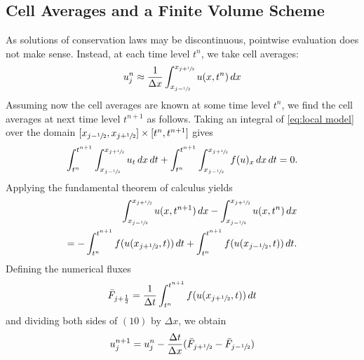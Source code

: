 \subsection{Cell Averages and a Finite Volume Scheme}
As solutions of conservation laws may be discontinuous, pointwise evaluation does not make sense. Instead, at each time level $t^n$, we take cell averages:
\begin{equation}
    \begin{split}
        u_{j}^{n} \approx \frac{1}{\Delta x}\int_{x_{j-\sfrac{1}{2}}}^{x_{j+\sfrac{1}{2}}} u(x,t^n) \,dx
    \end{split}
\end{equation}
Assuming now the cell averages are known at some time level $t^n$, we find the cell averages at next time level $t^{n+1}$ as follows. Taking an integral of \eqref{eq:local model} over the domain $[x_{j- \sfrac{1}{2}}, x_{j+\sfrac{1}{2}}] \times [t^n, t^{n+1}] $ gives
\begin{align*}
    \int_{t^n}^{t^{n+1}} \int_{x_{j-\sfrac{1}{2}}}^{x_{j+\sfrac{1}{2}}} {u_{t} \,dx \, dt}
    +\int_{t^n}^{t^{n+1}} \int_{x_{j-\sfrac{1}{2}}}^{x_{j+\sfrac{1}{2}}} f(u)_{x} \,dx \, dt = 0.
\end{align*}
Applying the fundamental theorem of calculus yields
\begin{equation}\label{eq:fundamental theorem}
    \begin{split}
        \int_{x_{j-\sfrac{1}{2}}}^{x_{j+\sfrac{1}{2}}} u(x, t^{n+1}) \,dx
        - \int_{x_{j-\sfrac{1}{2}}}^{x_{j+\sfrac{1}{2}}} u(x, t^{n}) \,dx \\
        = - \int_{t^n}^{t^{n+1}} f(u(x_{j +\sfrac{1}{2}},t)) \,dt + \int_{t^n}^{t^{n+1}} f(u(x_{j-\sfrac{1}{2}},t)) \,dt.
    \end{split}
\end{equation}
Defining the numerical fluxes
\begin{equation}\label{eq:numerical fluxes}
    \begin{split}
        {\bar{F}}_{j+ \frac{1}{2}} = \frac{1}{\Delta t} \int_{t^n}^{t^{n+1}} f(u(x_{j +\sfrac{1}{2}},t)) \,dt
    \end{split}
\end{equation}
and dividing both sides of $(10)$ by $\Delta x$, we obtain
\begin{equation} \label{eq:FVM with numerical fluxes}
    \begin{split}
        u_{j}^{n+1} = u_{j}^{n} - \frac{\Delta t}{\Delta x}( {\bar{F}}_{j+ \sfrac{1}{2}} -{\bar{F}}_{j- \sfrac{1}{2}})
    \end{split}
\end{equation}
